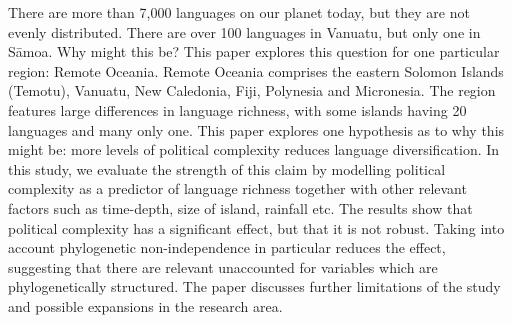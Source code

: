 There are more than 7,000 languages on our planet today, but they are not evenly distributed. There are over 100 languages in Vanuatu, but only one in S\={a}moa. Why might this be? This paper explores this question for one particular region: Remote Oceania. Remote Oceania comprises the eastern Solomon Islands (Temotu), Vanuatu, New Caledonia, Fiji, Polynesia and Micronesia. The region features large differences in language richness, with some islands having 20 languages and many only one. This paper explores one hypothesis as to why this might be: more levels of political complexity reduces language diversification. In this study, we evaluate the strength of this claim by modelling political complexity as a predictor of language richness together with other relevant factors such as time-depth, size of island, rainfall etc. The results show that political complexity has a significant effect, but that it is not robust. Taking into account phylogenetic non-independence in particular reduces the effect, suggesting that there are relevant unaccounted for variables which are phylogenetically structured. The paper discusses further limitations of the study and possible expansions in the research area. 